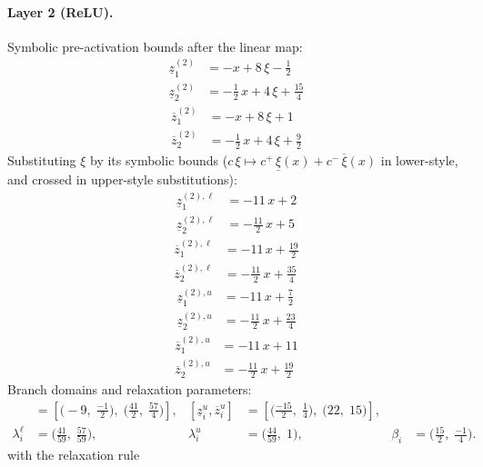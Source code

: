 \documentclass[11pt]{article}
\begin{document}
\paragraph{Layer 2 (ReLU).}
Symbolic pre-activation bounds after the linear map:
\begin{align*}
\underline{z}^{(2)}_{1} &= -x + 8\,\xi - \frac{1}{2} \\
\underline{z}^{(2)}_{2} &= -\frac{1}{2}\,x + 4\,\xi + \frac{15}{4}
\end{align*}
\begin{align*}
\overline{z}^{(2)}_{1} &= -x + 8\,\xi + 1 \\
\overline{z}^{(2)}_{2} &= -\frac{1}{2}\,x + 4\,\xi + \frac{9}{2}
\end{align*}
Substituting $\xi$ by its symbolic bounds ($c\,\xi \mapsto c^{+}\,\underline{\xi}(x) + c^{-}\,\overline{\xi}(x)$ in lower-style, and crossed in upper-style substitutions):
\begin{align*}
\underline{z}^{(2),\ell}_{1} &= -11\,x + 2 \\
\underline{z}^{(2),\ell}_{2} &= -\frac{11}{2}\,x + 5
\end{align*}
\begin{align*}
\overline{z}^{(2),\ell}_{1} &= -11\,x + \frac{19}{2} \\
\overline{z}^{(2),\ell}_{2} &= -\frac{11}{2}\,x + \frac{35}{4}
\end{align*}
\begin{align*}
\underline{z}^{(2),u}_{1} &= -11\,x + \frac{7}{2} \\
\underline{z}^{(2),u}_{2} &= -\frac{11}{2}\,x + \frac{23}{4}
\end{align*}
\begin{align*}
\overline{z}^{(2),u}_{1} &= -11\,x + 11 \\
\overline{z}^{(2),u}_{2} &= -\frac{11}{2}\,x + \frac{19}{2}
\end{align*}
Branch domains and relaxation parameters:
\begin{align*}
[\underline{z}^{\ell}_i, \overline{z}^{\ell}_i] &= [\bigl(-9,\; \frac{-1}{2}\bigr),\; \bigl(\frac{41}{2},\; \frac{57}{4}\bigr)], & [\underline{z}^{u}_i, \overline{z}^{u}_i] &= [\bigl(\frac{-15}{2},\; \frac{1}{4}\bigr),\; \bigl(22,\; 15\bigr)], \\
\lambda^{\ell}_i &= \bigl(\frac{41}{59},\; \frac{57}{59}\bigr), & \lambda^{u}_i &= \bigl(\frac{44}{59},\; 1\bigr), & \beta_i &= \bigl(\frac{15}{2},\; \frac{-1}{4}\bigr).
\end{align*}
with the relaxation rule
\end{document}
